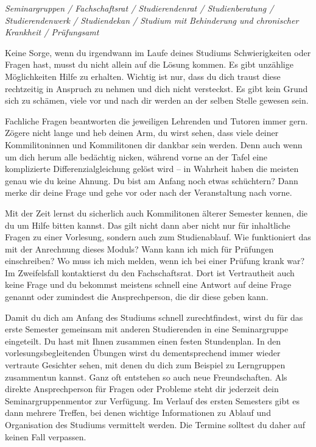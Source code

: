 
\textit{Seminargruppen / Fachschaftsrat / Studierendenrat / Studienberatung / Studierendenwerk / Studiendekan / Studium mit Behinderung und chronischer Krankheit / Prüfungsamt}

Keine Sorge, wenn du irgendwann im Laufe deines Studiums Schwierigkeiten oder Fragen hast, musst du nicht allein auf die Lösung kommen.  
Es gibt unzählige Möglichkeiten Hilfe zu erhalten.
Wichtig ist nur, dass du dich traust diese rechtzeitig in Anspruch zu nehmen und dich nicht versteckst. Es gibt kein Grund sich zu schämen, viele vor und nach dir werden an der selben Stelle gewesen sein. 

Fachliche Fragen beantworten die jeweiligen Lehrenden und Tutoren immer gern. Zögere nicht lange und heb deinen Arm, du wirst sehen, dass viele deiner Kommilitoninnen und Kommilitonen dir dankbar sein werden. Denn auch wenn um dich herum alle bedächtig nicken, während vorne an der Tafel eine komplizierte Differenzialgleichung gelöst wird -- in Wahrheit haben die meisten genau wie du keine Ahnung.
Du bist am Anfang noch etwas schüchtern? Dann merke dir deine Frage und gehe vor oder nach der Veranstaltung nach vorne.

Mit der Zeit lernst du sicherlich auch Kommilitonen älterer Semester kennen, die du um Hilfe bitten kannst. 
Das gilt nicht dann aber nicht nur für inhaltliche Fragen zu einer Vorlesung, sondern auch zum Studienablauf.
Wie funktioniert das mit der Anrechnung dieses Moduls? Wann kann ich mich für Prüfungen einschreiben? Wo muss ich mich melden, wenn ich bei einer Prüfung krank war? Im Zweifelsfall kontaktierst du den Fachschaftsrat. Dort ist Vertrautheit auch keine Frage und du bekommst meistens schnell eine Antwort auf deine Frage genannt oder zumindest die Ansprechperson, die dir diese geben kann.

\label{sec:seminargruppen}
Damit du dich am Anfang des Studiums schnell zurechtfindest, wirst du für das erste Semester gemeinsam mit anderen Studierenden in eine Seminargruppe eingeteilt.
Du hast mit Ihnen zusammen einen festen Stundenplan. 
In den vorlesungsbegleitenden Übungen wirst du dementsprechend immer wieder vertraute Gesichter sehen, mit denen du dich zum Beispiel zu Lerngruppen zusammentun kannst.
Ganz oft entstehen so auch neue Freundschaften.
Als direkte Ansprechperson für Fragen oder Probleme steht dir jederzeit dein Seminargruppenmentor zur Verfügung.
Im Verlauf des ersten Semesters gibt es dann mehrere Treffen, bei denen wichtige Informationen zu Ablauf und Organisation des Studiums vermittelt werden. Die Termine solltest du daher auf keinen Fall verpassen.

